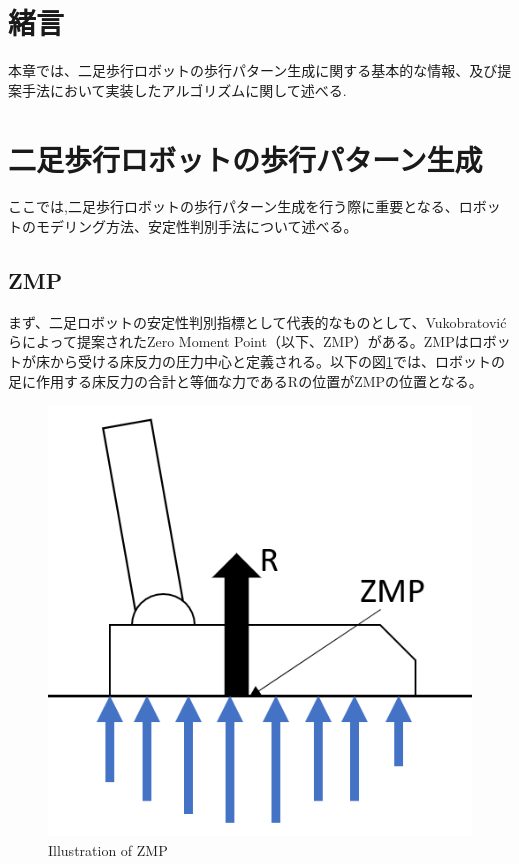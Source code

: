 \section{緒言}
本章では、二足歩行ロボットの歩行パターン生成に関する基本的な情報、及び提案手法において実装したアルゴリズムに関して述べる.

\section{二足歩行ロボットの歩行パターン生成}
ここでは,二足歩行ロボットの歩行パターン生成を行う際に重要となる、ロボットのモデリング方法、安定性判別手法について述べる。

\subsection{ZMP}
まず、二足ロボットの安定性判別指標として代表的なものとして、Vukobratovićらによって提案されたZero Moment Point（以下、ZMP）\cite{VUKOBRATOVIC19721}がある。ZMPはロボットが床から受ける床反力の圧力中心と定義される。以下の図\ref{Fig:zmpillust}では、ロボットの足に作用する床反力の合計と等価な力であるRの位置がZMPの位置となる。

\begin{figure}[hbtp]
  \centering
  \includegraphics[keepaspectratio, scale=0.6]
  {images/zmp_ilust.png}
  \caption{Illustration of ZMP }
  \label{Fig:zmpillust}
\end{figure}
\newpage

